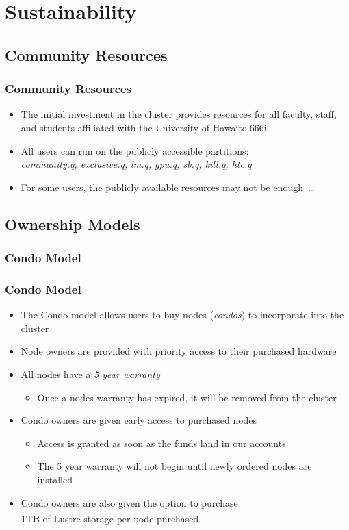 \documentclass[t,hyperref={pdfpagelabels=false}]{beamer}
\newlength{\okinalen}
\newcommand{\okina}{\hbox to.666\okinalen{\hss`\hss}}
\newcommand{\regtrademark}{\fontsize{5}{6}\selectfont \textsuperscript{\textregistered}}
\newcommand{\hawaii}{Hawai{\okina}i}
\newcommand{\lustre}{Lustre{\regtrademark}}
\begin{document}
\section{Sustainability}
\subsection{Community Resources}
\begin{frame}
	\frametitle{Community Resources}
	\begin{itemize}
		\item The initial investment in the cluster provides resources for all faculty, staff, and students affiliated with the University of {\hawaii}
		\item All users can run on the publicly accessible partitions:\\ \emph{community.q, exclusive.q, lm.q, gpu.q, sb.q, kill.q, htc.q}
		\item For some users, the publicly available resources may not be enough~\ldots
	\end{itemize}
\end{frame}

\subsection{Ownership Models}

\subsubsection{Condo Model}
\begin{frame}
	\frametitle{Condo Model}
	\begin{itemize}
		\item The Condo model allows users to buy nodes (\emph{condos}) to incorporate into the cluster	
		\item Node owners are provided with priority access to their purchased hardware
		\item All nodes have a \emph{5 year warranty}
		\begin{itemize}
			\item Once a nodes warranty has expired, it will be removed from the cluster
		\end{itemize}
		\item Condo owners are given early access to purchased nodes
		  \begin{itemize}
                    \item Access is granted as soon as the funds land in our accounts
		    \item The 5 year warranty will not begin until newly ordered nodes are installed
		\end{itemize}
		\item Condo owners are also given the option to purchase~\\1TB of {\lustre} storage per node purchased
	\end{itemize}
\end{frame}
\end{document}
